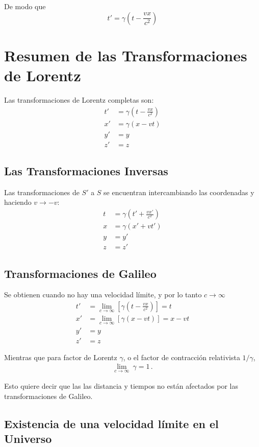 \documentclass[11pt,a4paper]{book}
\begin{document}
De modo que
\[ \boxed{t' = \gamma \left( t - \frac{vx}{c^2} \right)} \]

\section{Resumen de las Transformaciones de Lorentz}
Las transformaciones de Lorentz completas son:
\[
\boxed{
\begin{aligned}
t' &= \gamma \left( t - \frac{vx}{c^2} \right) \\
x' &= \gamma (x - vt) \\
y' &= y \\
z' &= z
\end{aligned}
}
\]

\subsection{Las Transformaciones Inversas}
Las transformaciones de $S'$ a $S$ se encuentran intercambiando las coordenadas y haciendo $v \to -v$:
\[
\boxed{
\begin{aligned}
t &= \gamma \left( t' + \frac{vx'}{c^2} \right) \\
x &= \gamma (x' + vt') \\
y &= y' \\
z &= z'
\end{aligned}
}
\]

\subsection{Transformaciones de Galileo}
Se obtienen cuando no hay una velocidad límite, y por lo tanto $c\to \infty$
\begin{align*}
t' &= \lim_{c\to\infty}\left[\gamma \left( t - \frac{vx}{c^2} \right)\right] 
    = t\\
x' &= \lim_{c\to\infty}\left[\gamma (x - vt)\right]  = x - vt \\
y' &= y \\
z' &= z
\end{align*}

Mientras que para factor de Lorentz $\gamma$, o el factor de contracción relativista $1/\gamma$, 
\begin{align}
    \lim_{c\to\infty}\ \gamma = 1\,. 
\end{align}

Esto quiere decir que las las distancia y tiempos no están afectados por las transformaciones de Galileo.

\subsection{Existencia de una velocidad límite en el Universo}
\end{document}
